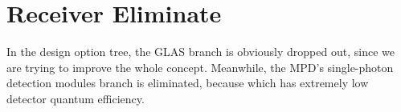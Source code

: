 \section{Receiver Eliminate}
\label{mtrTOReceiver}
In the design option tree, the GLAS branch is obviously dropped out, since we are trying to improve the whole concept. Meanwhile, the MPD's single-photon detection modules branch is eliminated, because which has extremely low detector quantum efficiency. 